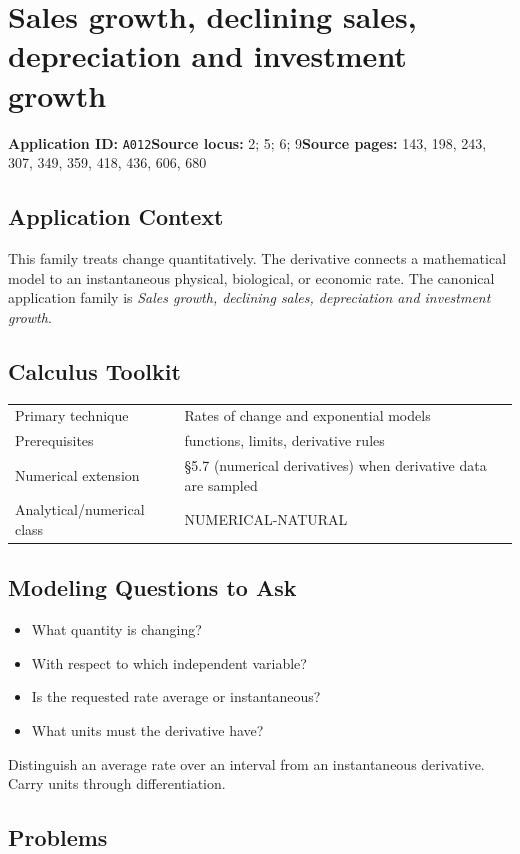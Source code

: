 \documentclass[11pt]{book}
\newcommand{\pid}[1]{\texttt{#1}}
\begin{document}
\chapter{Sales growth, declining sales, depreciation and investment growth}\label{app:A012}
\textbf{Application ID:} \pid{A012}\quad \textbf{Source locus:} 2; 5; 6; 9\quad \textbf{Source pages:} 143, 198, 243, 307, 349, 359, 418, 436, 606, 680
\section*{Application Context}
This family treats change quantitatively. The derivative connects a mathematical model to an instantaneous physical, biological, or economic rate. The canonical application family is \emph{Sales growth, declining sales, depreciation and investment growth}.
\section*{Calculus Toolkit}
\begin{tabularx}{\textwidth}{@{}lX@{}}\toprule
Primary technique & Rates of change and exponential models \\
Prerequisites & functions, limits, derivative rules \\
Numerical extension & §5.7 (numerical derivatives) when derivative data are sampled \\
Analytical/numerical class & NUMERICAL-NATURAL \\
\bottomrule\end{tabularx}
\section*{Modeling Questions to Ask}\begin{itemize}
\item What quantity is changing?
\item With respect to which independent variable?
\item Is the requested rate average or instantaneous?
\item What units must the derivative have?
\end{itemize}
\begin{errorbox}Distinguish an average rate over an interval from an instantaneous derivative. Carry units through differentiation.\end{errorbox}
\section*{Problems}
\end{document}
